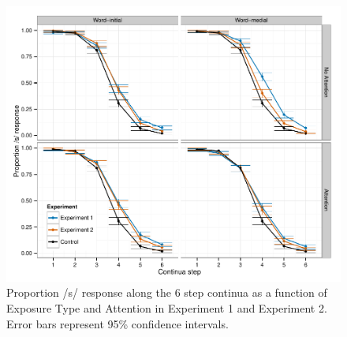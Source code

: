 \begin{figure}[!ht]
\caption{Proportion /s/ response along the 6 step continua as a function of Exposure Type and Attention in Experiment 1 and Experiment 2. Error bars represent 95\% confidence intervals.}
\label{fig:exp12categ}
\begin{center}
\includegraphics[width=\textwidth]{graphs/exp12_categresults}
\end{center}
\end{figure}

